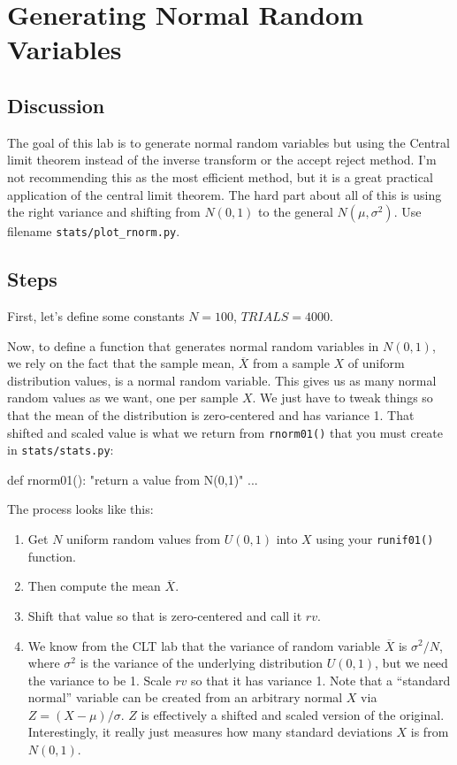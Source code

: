 \chapter{Generating Normal Random Variables}

\setcounter{problem}{1}
\section{Discussion}

\begin{fullwidth}


The goal of this lab is to generate normal random variables but using the Central limit theorem instead of the inverse transform or the accept reject method. I'm not recommending this as the most efficient method, but it is a great practical application of the central limit theorem.  The hard part about all of this is using the right variance and shifting from $N(0,1)$ to the general $N(\mu, \sigma^2)$. Use filename {\tt stats/plot\_rnorm.py}.

\section{Steps}

\step First, let's define some constants $N = 100$, $TRIALS = 4000$.

\step Now, to define a function that generates normal random variables in $N(0,1)$, we rely on the fact that the sample mean, $\overline X$ from a sample $X$ of uniform distribution values, is a normal random variable.  This gives us as many normal random values as we want, one per sample $X$. We just have to tweak things so that the mean of the distribution is zero-centered and has variance 1. That shifted and scaled value is what we return from {\tt rnorm01()} that you must create in {\tt stats/stats.py}:

\begin{pyverbatim}
def rnorm01():
    "return a value from N(0,1)"
    ...
\end{pyverbatim}	

\noindent The process looks like this:

\renewcommand{\theenumi}{\Alph{enumi}}

\begin{enumerate}
\item Get $N$ uniform random values from $U(0,1)$ into $X$ using your {\tt runif01()} function.
\item Then compute the mean $\overline X$.
\item Shift that value so that is zero-centered and call it $rv$.
\item We know from the CLT lab that the variance of random variable $\overline X$ is $\sigma^2 / N$, where $\sigma^2$ is the variance of the underlying distribution $U(0,1)$, but we need the variance to be 1. Scale $rv$ so that it has variance 1. Note that a ``standard normal'' variable can be created from an arbitrary normal $X$ via $Z = (X-\mu)/\sigma$. $Z$ is effectively a shifted and scaled version of the original.  Interestingly, it really just measures how many standard deviations $X$ is from $N(0,1)$.
\end{enumerate}


\end{fullwidth}
